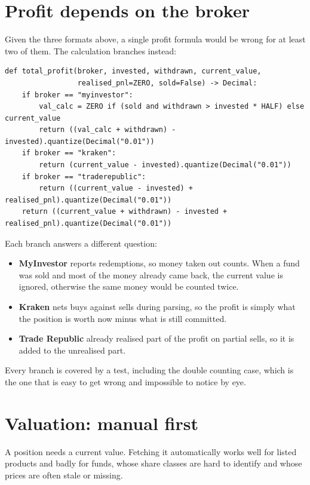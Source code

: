 \section{Profit depends on the broker}

Given the three formats above, a single profit formula would be wrong for at
least two of them. The calculation branches instead:

\begin{lstlisting}[style=py]
def total_profit(broker, invested, withdrawn, current_value,
                 realised_pnl=ZERO, sold=False) -> Decimal:
    if broker == "myinvestor":
        val_calc = ZERO if (sold and withdrawn > invested * HALF) else current_value
        return ((val_calc + withdrawn) - invested).quantize(Decimal("0.01"))
    if broker == "kraken":
        return (current_value - invested).quantize(Decimal("0.01"))
    if broker == "traderepublic":
        return ((current_value - invested) + realised_pnl).quantize(Decimal("0.01"))
    return ((current_value + withdrawn) - invested + realised_pnl).quantize(Decimal("0.01"))
\end{lstlisting}

Each branch answers a different question:

\begin{itemize}
  \item \textbf{MyInvestor} reports redemptions, so money taken out counts. When
        a fund was sold and most of the money already came back, the current
        value is ignored, otherwise the same money would be counted twice.
  \item \textbf{Kraken} nets buys against sells during parsing, so the profit is
        simply what the position is worth now minus what is still committed.
  \item \textbf{Trade Republic} already realised part of the profit on partial
        sells, so it is added to the unrealised part.
\end{itemize}

Every branch is covered by a test, including the double counting case, which is
the one that is easy to get wrong and impossible to notice by eye.

\section{Valuation: manual first}

A position needs a current value. Fetching it automatically works well for
listed products and badly for funds, whose share classes are hard to identify
and whose prices are often stale or missing.

